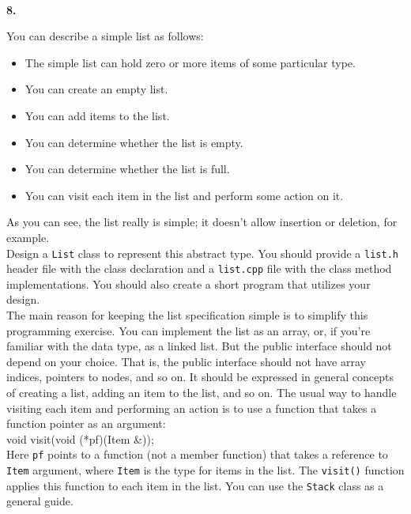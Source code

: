 \documentclass[10 pt]{amsart}
\newlength{\cwidth}
\newenvironment{cpart}[2][\cwidth]
	{\\ \phantom{\qquad}\textbf{#2. }\begin{minipage}[t]{#1}}
	{\end{minipage}}
\newcommand{\ttt}[1]{\texttt{#1}}
\begin{document}
	\begin{cpart}{8}
		You can describe a simple list as follows:
		\begin{itemize}
			\item 
				The simple list can hold zero or more items of some 
				particular type.
			\item
				You can create an empty list.
			\item 
				You can add items to the list.
			\item
				You can determine whether the list is empty.
			\item
				You can determine whether the list is full.
			\item
				You can visit each item in the list and perform some
				action on it.
		\end{itemize}
		As you can see, the list really is simple;
		it doesn't allow insertion or deletion, for example. \\[2ex]
		Design a \ttt{List} class to represent this abstract type.
		You should provide a \ttt{list.h} header file with 
		the class declaration and a \ttt{list.cpp} file with the 
		class method implementations.
		You should also create a short program that utilizes your
		design. \\[2ex]
		The main reason for keeping the list specification simple is to
		simplify this programming exercise.
		You can implement the list as an array, or, if you're familiar
		with the data type, as a linked list.
		But the public interface should not depend on your choice.
		That is, the public interface should not have array indices,
		pointers to nodes, and so on.
		It should be expressed in general concepts of creating a list, 
		adding an item to the list, and so on.
		The usual way to handle visiting each item and performing an 
		action is to use a function that takes a function pointer
		as an argument: \\[2ex]
		{\ttfamily
			void visit(void (*pf)(Item \&));
		} \\[2ex]
		Here \ttt{pf} points to a function (not a member function)
		that takes a reference to \ttt{Item} argument, where
		\ttt{Item} is the type for items in the list.
		The \ttt{visit()} function applies this function to each
		item in the list.
		You can use the \ttt{Stack} class as a general guide.
	\end{cpart}
	\vspace{2ex}
\end{document}
